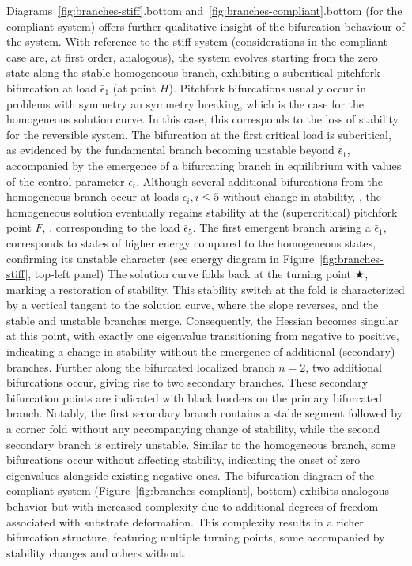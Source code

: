     {
        Diagrams~\ref{fig:branches-stiff}.bottom and~\ref{fig:branches-compliant}.bottom (for the compliant system) offers further qualitative insight of the bifurcation behaviour of the system.
        With reference to the stiff system (considerations in the compliant case are, at first order, analogous),
        the system evolves starting from the zero state along the stable homogeneous branch, exhibiting a subcritical pitchfork bifurcation at load $\bar \epsilon_1$ (at point $H$).
        Pitchfork bifurcations usually occur in problems with symmetry an symmetry breaking, which is the
        case for the homogeneous solution curve.
        In this case, this corresponds to the loss of stability for the reversible system.
        The bifurcation at the first critical load is subcritical, as evidenced by the fundamental branch becoming unstable beyond $\bar \epsilon_1$, accompanied by the emergence of a bifurcating branch in equilibrium with values of the control parameter $\bar \epsilon_t$.
        Although several additional bifurcations from the homogeneous branch occur at loads $\bar \epsilon_i, i\leq 5$ without change in stability,
        , the homogeneous solution eventually regains stability at the (supercritical) pitchfork point $F$, , corresponding to the load $\bar \epsilon_5$.
        The first emergent branch arising a $\bar \epsilon_1$, corresponds to states of higher energy compared to the homogeneous states, confirming its unstable character (see energy diagram in Figure~\ref{fig:branches-stiff}, top-left panel)
        The solution curve folds back at the turning point $\bigstar$, marking a restoration of stability. This stability switch at the fold is characterized by a vertical tangent to the solution curve, where the slope reverses, and the stable and unstable branches merge. Consequently, the Hessian becomes singular at this point, with exactly one eigenvalue transitioning from negative to positive, indicating a change in stability without the emergence of additional (secondary) branches.
        Further along the bifurcated localized branch $n=2$, two additional bifurcations occur, giving rise to two secondary branches. These secondary bifurcation points are indicated with black borders on the primary bifurcated branch. Notably, the first secondary branch contains a stable segment followed by a corner fold without any accompanying change of stability, while the second secondary branch is entirely unstable.
        Similar to the homogeneous branch, some bifurcations occur without affecting stability, indicating the onset of zero eigenvalues alongside existing negative ones. The bifurcation diagram of the compliant system (Figure~\ref{fig:branches-compliant}, bottom) exhibits analogous behavior but with increased complexity due to additional degrees of freedom associated with substrate deformation. This complexity results in a richer bifurcation structure, featuring multiple turning points, some accompanied by stability changes and others without.
    }

